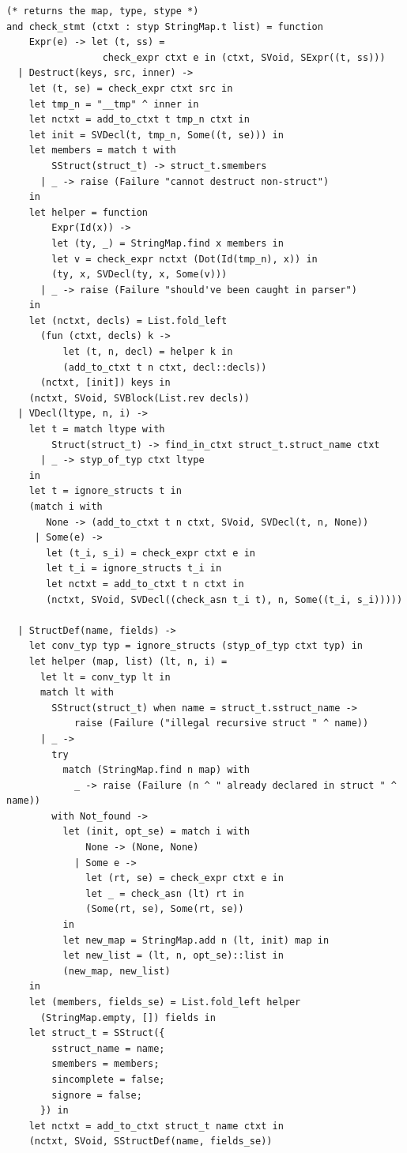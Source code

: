 \documentclass[12pt]{article}
\begin{document}
\begin{mdframed}[hidealllines=true,backgroundcolor=blue!20]
\begin{lstlisting}
(* returns the map, type, stype *)
and check_stmt (ctxt : styp StringMap.t list) = function
    Expr(e) -> let (t, ss) = 
                 check_expr ctxt e in (ctxt, SVoid, SExpr((t, ss)))
  | Destruct(keys, src, inner) ->
    let (t, se) = check_expr ctxt src in
    let tmp_n = "__tmp" ^ inner in
    let nctxt = add_to_ctxt t tmp_n ctxt in
    let init = SVDecl(t, tmp_n, Some((t, se))) in
    let members = match t with 
        SStruct(struct_t) -> struct_t.smembers
      | _ -> raise (Failure "cannot destruct non-struct")
    in
    let helper = function
        Expr(Id(x)) -> 
        let (ty, _) = StringMap.find x members in
        let v = check_expr nctxt (Dot(Id(tmp_n), x)) in
        (ty, x, SVDecl(ty, x, Some(v)))
      | _ -> raise (Failure "should've been caught in parser")
    in
    let (nctxt, decls) = List.fold_left 
      (fun (ctxt, decls) k -> 
          let (t, n, decl) = helper k in 
          (add_to_ctxt t n ctxt, decl::decls)) 
      (nctxt, [init]) keys in
    (nctxt, SVoid, SVBlock(List.rev decls))
  | VDecl(ltype, n, i) ->
    let t = match ltype with 
        Struct(struct_t) -> find_in_ctxt struct_t.struct_name ctxt 
      | _ -> styp_of_typ ctxt ltype
    in
    let t = ignore_structs t in
    (match i with
       None -> (add_to_ctxt t n ctxt, SVoid, SVDecl(t, n, None))
     | Some(e) ->
       let (t_i, s_i) = check_expr ctxt e in
       let t_i = ignore_structs t_i in
       let nctxt = add_to_ctxt t n ctxt in
       (nctxt, SVoid, SVDecl((check_asn t_i t), n, Some((t_i, s_i)))))

  | StructDef(name, fields) ->
    let conv_typ typ = ignore_structs (styp_of_typ ctxt typ) in
    let helper (map, list) (lt, n, i) =
      let lt = conv_typ lt in
      match lt with
        SStruct(struct_t) when name = struct_t.sstruct_name -> 
            raise (Failure ("illegal recursive struct " ^ name))
      | _ ->
        try
          match (StringMap.find n map) with
            _ -> raise (Failure (n ^ " already declared in struct " ^ name))
        with Not_found ->
          let (init, opt_se) = match i with
              None -> (None, None)
            | Some e ->
              let (rt, se) = check_expr ctxt e in
              let _ = check_asn (lt) rt in
              (Some(rt, se), Some(rt, se))
          in
          let new_map = StringMap.add n (lt, init) map in
          let new_list = (lt, n, opt_se)::list in
          (new_map, new_list)
    in
    let (members, fields_se) = List.fold_left helper 
      (StringMap.empty, []) fields in
    let struct_t = SStruct({
        sstruct_name = name;
        smembers = members;
        sincomplete = false;
        signore = false;
      }) in
    let nctxt = add_to_ctxt struct_t name ctxt in
    (nctxt, SVoid, SStructDef(name, fields_se))


\end{lstlisting}
\end{mdframed}
\end{document}
